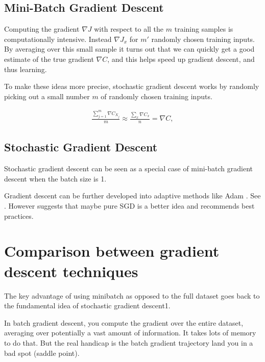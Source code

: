 \subsection{Mini-Batch Gradient Descent}

Computing the gradient $\nabla J$ with respect to all the $m$ training samples is computationally intensive. Instead $\nabla J_x$ for $m'$ randomly chosen training inputs. By averaging over this small sample it turns out that we can quickly get a good estimate of the true gradient $\nabla C$, and this helps speed up gradient descent, and thus learning.

To make these ideas more precise, stochastic gradient descent works by randomly picking out a small number $m$ of randomly chosen training inputs. 

\begin{eqnarray}
  \frac{\sum_{j=1}^m \nabla C_{X_{j}}}{m} \approx \frac{\sum_x \nabla C_x}{n} = \nabla C,
\end{eqnarray}


\subsection{Stochastic Gradient Descent}

Stochastic gradient descent can be seen as a special case of mini-batch gradient descent when the batch size is 1.



Gradient descent can be further developed into adaptive methods like Adam . See \cite{ruder2016}. However \cite{wilson2017} suggests that maybe pure SGD is a better idea and recommends best practices.

\section{Comparison between gradient descent techniques}


The key advantage of using minibatch as opposed to the full dataset goes back to the fundamental idea of stochastic gradient descent1.

In batch gradient descent, you compute the gradient over the entire dataset, averaging over potentially a vast amount of information. It takes lots of memory to do that. But the real handicap is the batch gradient trajectory land you in a bad spot (saddle point).

